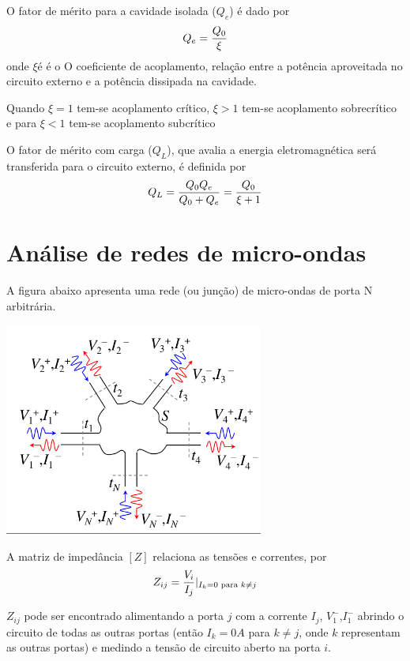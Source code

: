 O fator de mérito para a cavidade isolada ($Q_e$) é dado por
\begin{equation*}
	Q_e=\displaystyle \frac{\displaystyle Q_0 }{ \displaystyle \xi}
\end{equation*}
onde $\xi é $ é o O coeficiente de acoplamento, relação entre a potência aproveitada no circuito
externo e a potência dissipada na cavidade.


Quando $\xi=1$ tem-se acoplamento crítico, $\xi>1$ tem-se acoplamento sobrecrítico e para $\xi<1$ tem-se acoplamento subcrítico


O fator de mérito com carga ($Q_L$), que avalia a energia eletromagnética será transferida para o circuito
externo, é definida por 
\begin{equation*}
	Q_L=\displaystyle \frac{\displaystyle Q_0Q_e }{ \displaystyle Q_0+Q_e}=\displaystyle \frac{\displaystyle Q_0 }{ \displaystyle \xi+1}
\end{equation*}

\chapter{Análise de redes
de micro-ondas}

A figura abaixo apresenta uma rede (ou junção) de micro-ondas de porta N arbitrária.

\begin{center}
	\includegraphics[height=7cm]{imRedeuOndas.png}
\end{center}

A matriz de impedância $\left[Z\right]$ relaciona as tensões e
correntes, por
\begin{equation*}
	Z_{ij}=\displaystyle \frac{\displaystyle V_i }{ \displaystyle I_j}|_{I_k=0\text{ para }k\neq j}
\end{equation*}


$Z_{ij}$ pode ser
encontrado alimentando a porta $j$ com a corrente $I_j$, $V_1^-$,$I_1^-$
abrindo o circuito de todas as outras portas (então
$I_k = 0A$ para $k \neq j$, onde $k$ representam as outras
portas) e medindo a tensão de circuito aberto na
porta $i$.


